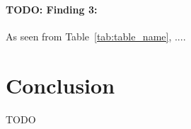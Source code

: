 \documentclass[11pt]{article}
\begin{document}
\paragraph{TODO: Finding 3:} As seen from Table~\ref{tab:table_name}, ....



\section{Conclusion}
TODO











\end{document}
